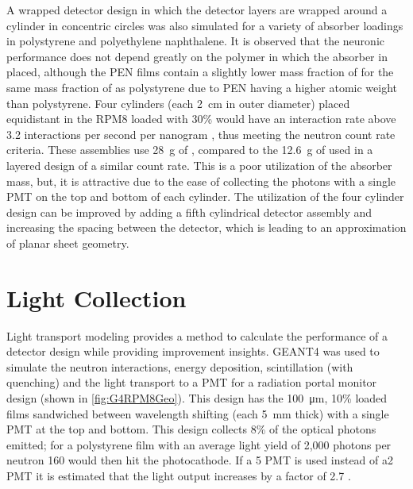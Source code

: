 A wrapped detector design in which the detector layers are wrapped around a cylinder in concentric circles was also simulated for a variety of absorber loadings in polystyrene and polyethylene naphthalene.
It is observed that the neuronic performance does not depend greatly on the polymer in which the absorber in placed, although the PEN films contain a slightly lower mass fraction of  for the same mass fraction of  as polystyrene due to PEN having a higher atomic weight than polystyrene.
Four cylinders (each \SI{2}{\cm} in outer diameter) placed equidistant in the RPM8 loaded with 30\%  would have an interaction rate above 3.2 interactions per second per nanogram , thus meeting the neutron count rate criteria. These assemblies use \SI{28}{\gram} of , compared to the \SI{12.6}{\gram} of  used in a layered design of a similar count rate.
This is a poor utilization of the absorber mass, but, it is attractive due to the ease of collecting the photons with a single PMT on the top and bottom of each cylinder.
The  utilization of the four cylinder design can be improved by adding a fifth cylindrical detector assembly and increasing the spacing between the detector, which is leading to an approximation of planar sheet geometry.


\section{Light Collection}
Light transport modeling provides a method to calculate the performance of a detector design while providing improvement insights.
GEANT4 was used to simulate the neutron interactions, energy deposition, scintillation (with quenching) and the light transport to a PMT for a radiation portal monitor design (shown in \autoref{fig:G4RPM8Geo}).
This design has the \SI{100}{\um}, 10\% loaded  films sandwiched between wavelength shifting (each \SI{5}{\mm} thick) with a single PMT at the top and bottom.
This design collects 8\% of the optical photons emitted; for a polystyrene film with an average light yield of 2,000 photons per neutron 160 would then hit the photocathode.
If a \SI{5}{\in} PMT is used instead of a\SI{2}{\in} PMT it is estimated that the light output increases by a factor of \num{2.7} \cite{pnnl_14283}.

